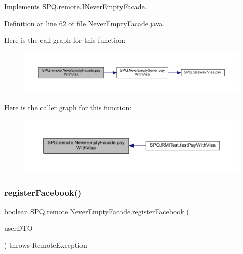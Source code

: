 Implements \mbox{\hyperlink{interface_s_p_q_1_1remote_1_1_i_never_empty_facade_a3b7058d95e7b73bdcc09220ecfc2d744}{S\+P\+Q.\+remote.\+I\+Never\+Empty\+Facade}}.



Definition at line 62 of file Never\+Empty\+Facade.\+java.

Here is the call graph for this function\+:
\nopagebreak
\begin{figure}[H]
\begin{center}
\leavevmode
\includegraphics[width=350pt]{class_s_p_q_1_1remote_1_1_never_empty_facade_a0ff9201cf33cb76c43dd85c892af93ba_cgraph}
\end{center}
\end{figure}
Here is the caller graph for this function\+:
\nopagebreak
\begin{figure}[H]
\begin{center}
\leavevmode
\includegraphics[width=350pt]{class_s_p_q_1_1remote_1_1_never_empty_facade_a0ff9201cf33cb76c43dd85c892af93ba_icgraph}
\end{center}
\end{figure}
\mbox{\label{class_s_p_q_1_1remote_1_1_never_empty_facade_aa9845001ecd5228135d64415a4c12b20}} 
\subsubsection{\texorpdfstring{register\+Facebook()}{registerFacebook()}}
{\footnotesize\ttfamily boolean S\+P\+Q.\+remote.\+Never\+Empty\+Facade.\+register\+Facebook (\begin{DoxyParamCaption}\item[{\mbox{\hyperlink{class_s_p_q_1_1dto_1_1_user_d_t_o}{User\+D\+TO}}}]{user\+D\+TO }\end{DoxyParamCaption}) throws Remote\+Exception}



